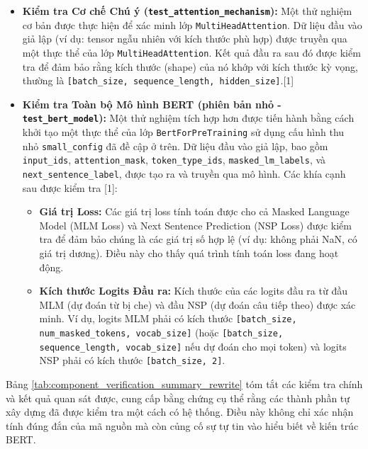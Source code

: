 \begin{itemize}
    \item \textbf{Kiểm tra Cơ chế Chú ý (\texttt{test\_attention\_mechanism}):} Một thử nghiệm cơ bản được thực hiện để xác minh lớp \texttt{MultiHeadAttention}. Dữ liệu đầu vào giả lập (ví dụ: tensor ngẫu nhiên với kích thước phù hợp) được truyền qua một thực thể của lớp \texttt{MultiHeadAttention}. Kết quả đầu ra sau đó được kiểm tra để đảm bảo rằng kích thước (shape) của nó khớp với kích thước kỳ vọng, thường là \texttt{[batch\_size, sequence\_length, hidden\_size]}.[1]

    \item \textbf{Kiểm tra Toàn bộ Mô hình BERT (phiên bản nhỏ - \texttt{test\_bert\_model}):} Một thử nghiệm tích hợp hơn được tiến hành bằng cách khởi tạo một thực thể của lớp \texttt{BertForPreTraining} sử dụng cấu hình thu nhỏ \texttt{small\_config} đã đề cập ở trên. Dữ liệu đầu vào giả lập, bao gồm \texttt{input\_ids}, \texttt{attention\_mask}, \texttt{token\_type\_ids}, \texttt{masked\_lm\_labels}, và \texttt{next\_sentence\_label}, được tạo ra và truyền qua mô hình. Các khía cạnh sau được kiểm tra [1]:
    \begin{itemize}
        \item \textbf{Giá trị Loss:} Các giá trị loss tính toán được cho cả Masked Language Model (MLM Loss) và Next Sentence Prediction (NSP Loss) được kiểm tra để đảm bảo chúng là các giá trị số hợp lệ (ví dụ: không phải NaN, có giá trị dương). Điều này cho thấy quá trình tính toán loss đang hoạt động.
        \item \textbf{Kích thước Logits Đầu ra:} Kích thước của các logits đầu ra từ đầu MLM (dự đoán từ bị che) và đầu NSP (dự đoán câu tiếp theo) được xác minh. Ví dụ, logits MLM phải có kích thước \texttt{[batch\_size, num\_masked\_tokens, vocab\_size]} (hoặc \texttt{[batch\_size, sequence\_length, vocab\_size]} nếu dự đoán cho mọi token) và logits NSP phải có kích thước \texttt{[batch\_size, 2]}.
    \end{itemize}
\end{itemize}
Bảng \ref{tab:component_verification_summary_rewrite} tóm tắt các kiểm tra chính và kết quả quan sát được, cung cấp bằng chứng cụ thể rằng các thành phần tự xây dựng đã được kiểm tra một cách có hệ thống. Điều này không chỉ xác nhận tính đúng đắn của mã nguồn mà còn củng cố sự tự tin vào hiểu biết về kiến trúc BERT.

